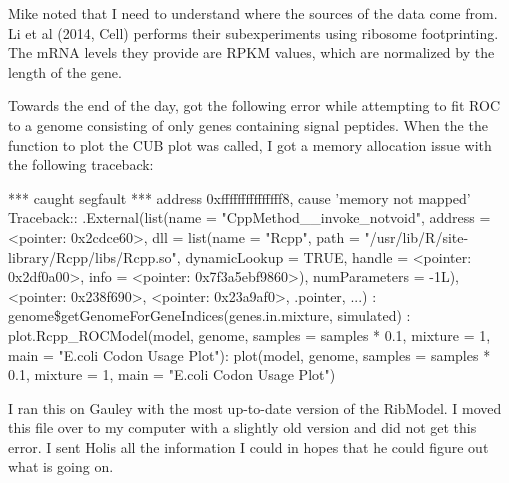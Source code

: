 \documentclass[11pt]{labbook}
\begin{document}
Mike noted that I need to understand where the sources of the data come from. Li et al (2014, Cell) performs their subexperiments using ribosome footprinting. The mRNA levels they provide are RPKM values, which are normalized by the length of the gene. 


Towards the end of the day, got the following error while attempting to fit ROC to a genome consisting of only genes containing signal peptides. When the the function to plot the CUB plot was called, I got a memory allocation issue with the following traceback:

*** caught segfault ***
address 0xfffffffffffffff8, cause 'memory not mapped'
\newline
Traceback:: .External(list(name = "CppMethod\_\_invoke\_notvoid", address = <pointer: 0x2cdce60>,     dll = list(name = "Rcpp", path = "/usr/lib/R/site-library/Rcpp/libs/Rcpp.so",         dynamicLookup = TRUE, handle = <pointer: 0x2df0a00>,         info = <pointer: 0x7f3a5ebf9860>), numParameters = -1L),     <pointer: 0x238f690>, <pointer: 0x23a9af0>, .pointer, ...)
: genome\$getGenomeForGeneIndices(genes.in.mixture, simulated)
: plot.Rcpp\_ROCModel(model, genome, samples = samples * 0.1, mixture = 1,     main = "E.coli Codon Usage Plot"): plot(model, genome, samples = samples * 0.1, mixture = 1, main = "E.coli Codon Usage Plot")
 \newline
 
I ran this on Gauley with the most up-to-date version of the RibModel. I moved this file over to my computer with a slightly old version and did not get this error. I sent Holis all the information I could in hopes that he could figure out what is going on.
\end{document}
